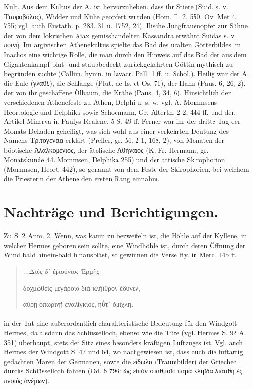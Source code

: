 \documentclass[a4paper, 11pt, oneside]{article}
\begin{document}
Kult. Aus dem Kultus der A. ist hervorzuheben. dass ihr Stiere (Suid. s. v. Ταυροβόλος), Widder und Kühe geopfert wurden (Hom. Il. 2, 550. Ov. Met 4, 755; vgl. auch Eustath. p. 283. 31 u. 1752, 24). Ilische Jungfrauenopfer zur Sühne der von dem lokrischen Aiax gemisshandelten Kassandra erwähnt Suidas s. v. ποινή. Im argivischen Athenekultus spielte das Bad des uralten Götterbildes im Inachos eine wichtige Rolle, die man durch den Hinweis auf das Bad der aus dem Gigantenkampf blut- und staubbedeckt zurückgekehrten Göttin mythisch zu begründen suchte (Callim. hymn. in lavacr. Pall. 1 ff. u. Schol.). Heilig war der A. die Eule (γλαῦξ), die Schlange (Plut. de Is. et Os. 71), der Hahn (Paus. 6, 26, 2), der von ihr geschaffene Ölbaum, die Krähe (Paus. 4, 34, 6). Hinsichtlich der verschiedenen Athenefeste zu Athen, Delphi u. s. w. vgl. A. Mommsens Heortologie und Delphika sowie Schoemann, Gr. Alterth. 2 2, 444 ff. und den Artikel Minerva in Paulys Realenc. 5 S. 49 ff. Ferner war ihr der dritte Tag der Monats-Dekaden geheiligt, was sich wohl aus einer verkehrten Deutung des Namens Τριτογένεια erklärt (Preller, gr. M. 2 1, 168, 2), von Monaten der böotische Ἀλαλκομένιος, der ätolische Ἀθήναιος (K. Fr. Hermann, gr. Monatskunde 44. Mommsen, Delphika 255) und der attische Skirophorion (Mommsen, Heort. 442), so genannt von dem Feste der Skirophorien, bei welchem die Priesterin der Athene den ersten Rang einnahm.
\clearpage
\section*{Nachträge und Berichtigungen.}
\paragraph{}
Zu S. 2 Anm. 2. Wenn, was kaum zu bezweifeln ist, die Höhle auf der Kyllene, in welcher Hermes geboren sein sollte, eine Windhöhle ist, durch deren Öffnung der Wind bald hinein-bald hinausbläst, so gewinnen die Verse Hy. in Merc. 145 ff.
\begin{quotation}
\hspace*{5mm}...Διὸς δ᾽ ἐριούνιος Ἑρμῆς

δοχμωθεὶς μεγάροιο διὰ κλήΐθρον ἔδυνεν,

αὔρῃ ὀπωρινῇ ἐναλίγκιος, ἠΰτ᾽ ὀμίχλη.
\end{quotation}
\paragraph{}
in der Tat eine außerordentlich charakteristische Bedeutung für den Windgott Hermes, da alsdann das Schlüsselloch, ebenso wie die Türe (vgl. Hermes S. 92 A. 351) überhaupt, stets der Sitz eines besonders kräftigen Luftzuges ist. Vgl. auch Hermes der Windgott S. 47 und 64, wo nachgewiesen ist, dass auch die luftartig gedachten Maren der Germanen, sowie die εἴδωλα (Traumbilder) der Griechen durchs Schlüsselloch fahren (Od. δ 796: ὡς εἰπὸν σταθμοῖο παρὰ κληῖδα λιάσθη ἐς πνοιὰς ἀνέμων).
\end{document}
